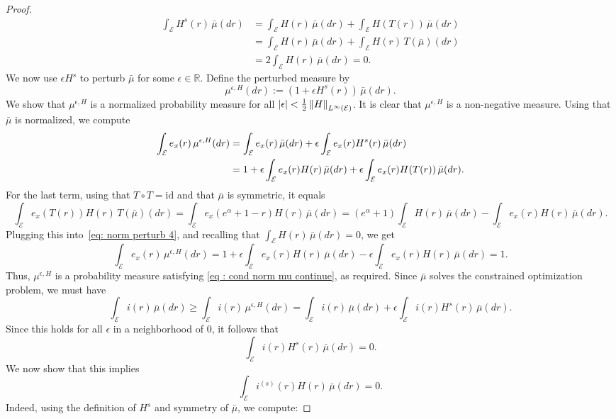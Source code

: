\documentclass[a4paper, 11pt]{article}
\theoremstyle{definition}
\newcommand{\norm}[1]{\left\|{#1}\right\|}
\newcommand{\modar}{\color{black}}
\DeclarePairedDelimiter{\abs}{\lvert}{\rvert}
\begin{document}
{\begin{proof}
\begin{align*}
\int_\mathcal{E} H^s(r)\, \bar{\mu}(dr) & = \int_\mathcal{E} H(r)\, \bar{\mu}(dr) + \int_\mathcal{E} H(T(r))\, \bar{\mu}(dr) \\
&= \int_\mathcal{E} H(r)\, \bar{\mu}(dr) + \int_\mathcal{E} H(r)\, T(\bar{\mu})(dr) \\
&= 2 \int_\mathcal{E} H(r)\, \bar{\mu}(dr) = 0.
\end{align*}
We now use $\epsilon H^s$ to perturb $\bar{\mu}$ for some {\modar $\epsilon\in \mathbb{R}$.} Define the perturbed measure by
\[
\mu^{\epsilon, H}(dr) := (1 + \epsilon H^s(r))\, \bar{\mu}(dr).
\]
We show that $\mu^{\epsilon, H}$ is a normalized probability measure {\modar for all $\abs*{\epsilon}< \frac{1}{2}\norm{H}_{{L}^\infty(\mathcal{E})}$. 
It is clear that $\mu^{\epsilon, H}$ is a non-negative measure.}
 Using that $\bar{\mu}$ is normalized, we compute
\begin{align}
\int_{\mathcal{E}} e_x(r)\, \mu^{\epsilon, H}(dr) &= \int_{\mathcal{E}} e_x(r)\, \bar{\mu}(dr) + \epsilon \int_{\mathcal{E}} e_x(r) H^s(r)\, \bar{\mu}(dr) \notag \\
&= 1 + \epsilon \int_{\mathcal{E}} e_x(r) H(r)\, \bar{\mu}(dr) + \epsilon \int_{\mathcal{E}} e_x(r) H(T(r))\, \bar{\mu}(dr). \label{eq: norm perturb 4}
\end{align}
For the last term, using that $T \circ T = \mathrm{id}$ and that $\bar{\mu}$ is symmetric, it equals
\[
\int_{\mathcal{E}} e_x(T(r)) H(r)\, T(\bar{\mu})(dr) = \int_{\mathcal{E}} e_x(e^\alpha + 1 - r) H(r)\, \bar{\mu}(dr) = (e^\alpha + 1) \int_{\mathcal{E}} H(r)\, \bar{\mu}(dr) - \int_{\mathcal{E}} e_x(r) H(r)\, \bar{\mu}(dr).
\]
Plugging this into~\eqref{eq: norm perturb 4}, and recalling that $\int_\mathcal{E} H(r)\, \bar{\mu}(dr) = 0$, we get
\[
\int_{\mathcal{E}} e_x(r)\, \mu^{\epsilon, H}(dr) = 1 + \epsilon \int_{\mathcal{E}} e_x(r) H(r)\, \bar{\mu}(dr) - \epsilon \int_{\mathcal{E}} e_x(r) H(r)\, \bar{\mu}(dr) = 1.
\]
Thus, $\mu^{\epsilon, H}$ is a probability measure satisfying \eqref{eq : cond norm mu continue}, as required. Since $\bar{\mu}$ solves the constrained optimization problem, we must have
\[
\int_\mathcal{E} i(r)\, \bar{\mu}(dr) \geq \int_\mathcal{E} i(r)\, \mu^{\epsilon, H}(dr) = \int_\mathcal{E} i(r)\, \bar{\mu}(dr) + \epsilon \int_\mathcal{E} i(r) H^s(r)\, \bar{\mu}(dr).
\]
Since this holds for all {\modar $\epsilon $ in a neighborhood of $0$,} it follows that
\[
\int_\mathcal{E} i(r) H^s(r)\, \bar{\mu}(dr) = 0.
\]
We now show that this implies
\[
\int_\mathcal{E} i^{(s)}(r) H(r)\, \bar{\mu}(dr) = 0.
\]
Indeed, using the definition of $H^s$ and symmetry of $\bar{\mu}$, we compute:

\end{proof}}
\end{document}
